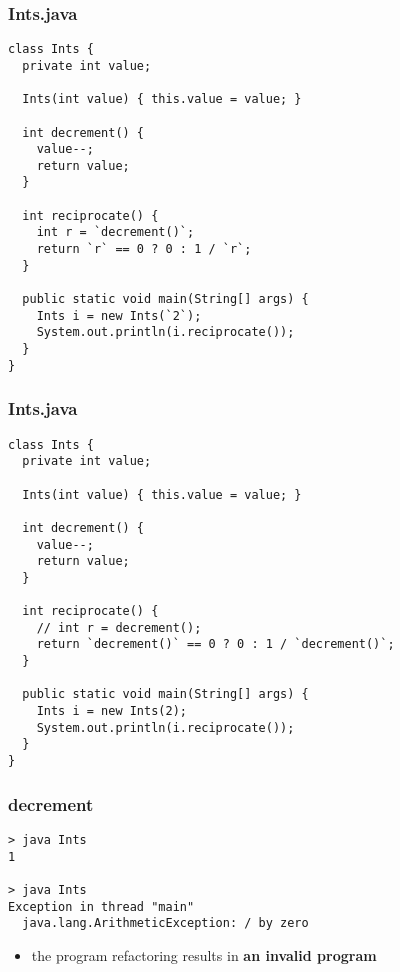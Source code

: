 \begin{frame}[fragile]
\frametitle{Ints.java}
\begin{lstlisting}
class Ints {
  private int value;

  Ints(int value) { this.value = value; }

  int decrement() {
    value--;
    return value;
  }

  int reciprocate() {
    int r = `decrement()`;
    return `r` == 0 ? 0 : 1 / `r`;
  }

  public static void main(String[] args) {
    Ints i = new Ints(`2`);
    System.out.println(i.reciprocate());
  }
}
\end{lstlisting}
\end{frame}

\begin{frame}[fragile]
\frametitle{Ints.java}
\begin{lstlisting}
class Ints {
  private int value;

  Ints(int value) { this.value = value; }

  int decrement() {
    value--;
    return value;
  }

  int reciprocate() {
    // int r = decrement();
    return `decrement()` == 0 ? 0 : 1 / `decrement()`;
  }

  public static void main(String[] args) {
    Ints i = new Ints(2);
    System.out.println(i.reciprocate());
  }
}
\end{lstlisting}
\end{frame}

\begin{frame}[fragile]
\frametitle{decrement}
\begin{block}{}
\begin{lstlisting}
> java Ints
1

> java Ints
Exception in thread "main"
  java.lang.ArithmeticException: / by zero
\end{lstlisting}
\end{block}
\begin{itemize}
  \item<1> the program refactoring results in \textbf{an invalid program}
\end{itemize}
\end{frame}